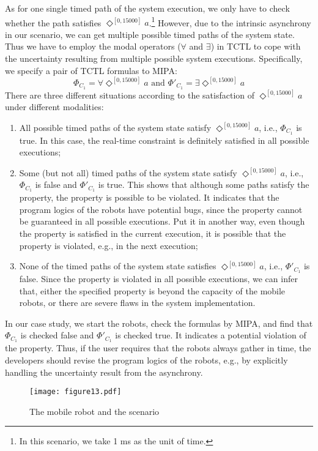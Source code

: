 \documentclass[10pt,conference,compsocconf,letterpaper]{IEEEtran}
\begin{document}
As for one single timed path of the system execution, we only have to check whether the path satisfies $\Diamond^{[0, 15000]} a$.\footnote{In this scenario, we take 1 ms as the unit of time.} However, due to the intrinsic asynchrony in our scenario, we can get multiple possible timed paths of the system state. Thus we have to employ the modal operators ($\forall$ and $\exists$) in TCTL to cope with the uncertainty resulting from multiple possible system executions. Specifically, we specify a pair of TCTL formulas to MIPA:
$$\Phi_{C_1} = \forall \Diamond^{[0, 15000]} a \textrm{ and } \Phi'_{C_1} = \exists \Diamond^{[0, 15000]} a$$
There are three different situations according to the satisfaction of $\Diamond^{[0, 15000]} a$ under different modalities:
\begin{enumerate}\setlength{\itemsep}{0pt}
    \item All possible timed paths of the system state satisfy $\Diamond^{[0, 15000]} a$, i.e., $\Phi_{C_1}$ is true. In this case, the real-time constraint is definitely satisfied in all possible executions;
    \item Some (but not all) timed paths of the system state satisfy $\Diamond^{[0, 15000]} a$, i.e., $\Phi_{C_1}$ is false and $\Phi'_{C_1}$ is true. This shows that although some paths satisfy the property, the property is possible to be violated. It indicates that the program logics of the robots have potential bugs, since the property cannot be guaranteed in all possible executions. Put it in another way, even though the property is satisfied in the current execution, it is possible that the property is violated, e.g., in the next execution;
    \item  None of the timed paths of the system state satisfies $\Diamond^{[0, 15000]} a$, i.e., $\Phi'_{C_1}$ is false. Since the property is violated in all possible executions, we can infer that, either the specified property is beyond the capacity of the mobile robots, or there are severe flaws in the system implementation.
\end{enumerate}


In our case study, we start the robots, check the formulas by MIPA, and find that $\Phi_{C_1}$ is checked false and $\Phi'_{C_1}$ is checked true. It indicates a potential violation of the property. Thus, if the user requires that the robots always gather in time, the developers should revise the program logics of the robots, e.g., by explicitly handling the uncertainty result from the asynchrony.

\begin{figure}[tbp]
\begin{center}
  \texttt{[image: figure13.pdf]}
  \caption{The mobile robot and the scenario}
  \label{F:case study}
\end{center}
\end{figure}
\end{document}
